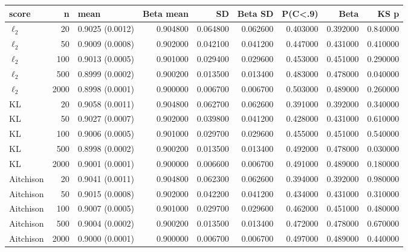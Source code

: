 \begin{tabular}{lrlrrrrrr}
\toprule
score & n & mean & Beta mean & SD & Beta SD & P(C<.9) & Beta & KS p \\
\midrule
$\ell_2$ & 20 & 0.9025 (0.0012) & 0.904800 & 0.064800 & 0.062600 & 0.403000 & 0.392000 & 0.840000 \\
$\ell_2$ & 50 & 0.9009 (0.0008) & 0.902000 & 0.042100 & 0.041200 & 0.447000 & 0.431000 & 0.410000 \\
$\ell_2$ & 100 & 0.9013 (0.0005) & 0.901000 & 0.029400 & 0.029600 & 0.453000 & 0.451000 & 0.290000 \\
$\ell_2$ & 500 & 0.8999 (0.0002) & 0.900200 & 0.013500 & 0.013400 & 0.483000 & 0.478000 & 0.040000 \\
$\ell_2$ & 2000 & 0.8998 (0.0001) & 0.900000 & 0.006700 & 0.006700 & 0.503000 & 0.489000 & 0.260000 \\
KL & 20 & 0.9058 (0.0011) & 0.904800 & 0.062700 & 0.062600 & 0.391000 & 0.392000 & 0.340000 \\
KL & 50 & 0.9027 (0.0007) & 0.902000 & 0.039800 & 0.041200 & 0.428000 & 0.431000 & 0.610000 \\
KL & 100 & 0.9006 (0.0005) & 0.901000 & 0.029700 & 0.029600 & 0.455000 & 0.451000 & 0.540000 \\
KL & 500 & 0.8998 (0.0002) & 0.900200 & 0.013500 & 0.013400 & 0.492000 & 0.478000 & 0.030000 \\
KL & 2000 & 0.9001 (0.0001) & 0.900000 & 0.006600 & 0.006700 & 0.491000 & 0.489000 & 0.180000 \\
Aitchison & 20 & 0.9041 (0.0011) & 0.904800 & 0.062300 & 0.062600 & 0.394000 & 0.392000 & 0.980000 \\
Aitchison & 50 & 0.9015 (0.0008) & 0.902000 & 0.042200 & 0.041200 & 0.434000 & 0.431000 & 0.310000 \\
Aitchison & 100 & 0.9007 (0.0005) & 0.901000 & 0.029700 & 0.029600 & 0.462000 & 0.451000 & 0.480000 \\
Aitchison & 500 & 0.9004 (0.0002) & 0.900200 & 0.013500 & 0.013400 & 0.472000 & 0.478000 & 0.670000 \\
Aitchison & 2000 & 0.9000 (0.0001) & 0.900000 & 0.006700 & 0.006700 & 0.497000 & 0.489000 & 0.440000 \\
\bottomrule
\end{tabular}
